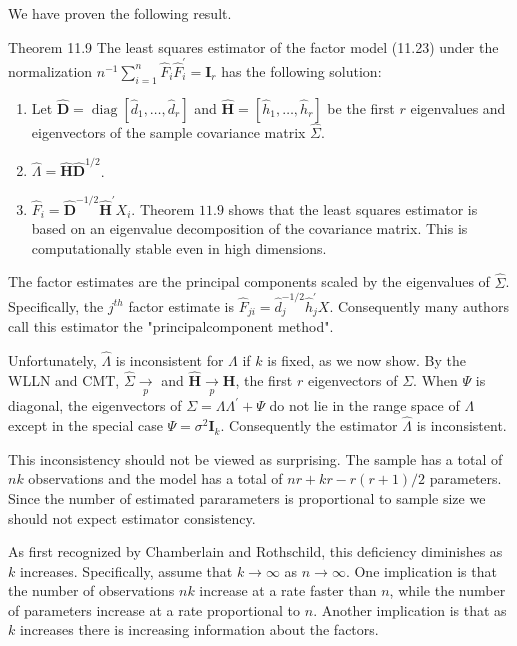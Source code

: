 \documentclass[10pt]{article}
\begin{document}
We have proven the following result.

Theorem 11.9 The least squares estimator of the factor model (11.23) under the normalization $n^{-1} \sum_{i=1}^{n} \widehat{F}_{i} \widehat{F}_{i}^{\prime}=\boldsymbol{I}_{r}$ has the following solution:

\begin{enumerate}
  \item Let $\widehat{\boldsymbol{D}}=\operatorname{diag}\left[\widehat{d}_{1}, \ldots, \widehat{d}_{r}\right]$ and $\widehat{\boldsymbol{H}}=\left[\widehat{h}_{1}, \ldots, \widehat{h}_{r}\right]$ be the first $r$ eigenvalues and eigenvectors of the sample covariance matrix $\widehat{\Sigma}$.

  \item $\widehat{\Lambda}=\widehat{\boldsymbol{H}} \widehat{\boldsymbol{D}}^{1 / 2}$.

  \item $\widehat{F}_{i}=\widehat{\boldsymbol{D}}^{-1 / 2} \widehat{\boldsymbol{H}}^{\prime} X_{i}$. Theorem $11.9$ shows that the least squares estimator is based on an eigenvalue decomposition of the covariance matrix. This is computationally stable even in high dimensions.

\end{enumerate}
The factor estimates are the principal components scaled by the eigenvalues of $\widehat{\Sigma}$. Specifically, the $j^{t h}$ factor estimate is $\widehat{F}_{j i}=\widehat{d}_{j}^{-1 / 2} \widehat{h}_{j}^{\prime} X$. Consequently many authors call this estimator the "principalcomponent method".

Unfortunately, $\widehat{\Lambda}$ is inconsistent for $\Lambda$ if $k$ is fixed, as we now show. By the WLLN and CMT, $\widehat{\Sigma} \underset{p}{\longrightarrow}$ and $\widehat{\boldsymbol{H}} \underset{p}{\longrightarrow} \boldsymbol{H}$, the first $r$ eigenvectors of $\Sigma$. When $\Psi$ is diagonal, the eigenvectors of $\Sigma=\Lambda \Lambda^{\prime}+\Psi$ do not lie in the range space of $\Lambda$ except in the special case $\Psi=\sigma^{2} \boldsymbol{I}_{k}$. Consequently the estimator $\widehat{\Lambda}$ is inconsistent.

This inconsistency should not be viewed as surprising. The sample has a total of $n k$ observations and the model has a total of $n r+k r-r(r+1) / 2$ parameters. Since the number of estimated pararameters is proportional to sample size we should not expect estimator consistency.

As first recognized by Chamberlain and Rothschild, this deficiency diminishes as $k$ increases. Specifically, assume that $k \rightarrow \infty$ as $n \rightarrow \infty$. One implication is that the number of observations $n k$ increase at a rate faster than $n$, while the number of parameters increase at a rate proportional to $n$. Another implication is that as $k$ increases there is increasing information about the factors.
\end{document}
